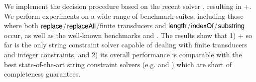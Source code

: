 %
We implement the decision procedure based on %
the recent {\ostrich} solver \cite{CHL+19},  resulting in {\ostrich}+.  We perform experiments on a wide range of benchmark suites, including those where both $\mathsf{replace}$/$\mathsf{replaceAll}$/finite transducers and $\mathsf{length}$/$\mathsf{indexOf}$/$\mathsf{substring}$ occur, as well as the well-known benchmarks {\kaluzabench} and {\pyexbench}.
The results show that  %
1) {\ostrich}+ so far is the only string constraint solver capable of dealing with finite transducers and integer constraints, and 2) its overall performance is comparable with the best state-of-the-art string constraint solvers (e.g. {\cvc} and {\zthreetrau}) which are short of completeness guarantees. 

\hide{
\smallskip

}

%
